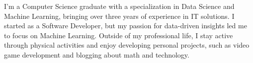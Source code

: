 

\begin{cvparagraph}



I’m a Computer Science graduate with a specialization in Data Science and
Machine Learning, bringing over three years of experience in IT solutions. I
started as a Software Developer, but my passion for data-driven insights led me
to focus on Machine Learning. Outside of my professional life, I stay active
through physical activities and enjoy developing personal projects, such as
video game development and blogging about math and technology.



\end{cvparagraph}
